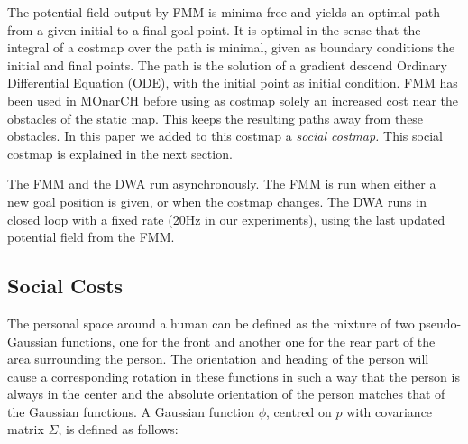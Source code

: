 The potential field output by FMM is minima free and yields an optimal path from a given initial to a final goal point. It is optimal in the sense that the integral of a costmap over the path is minimal, given as boundary conditions the initial and final points. The path is the solution of a gradient descend Ordinary Differential Equation (ODE), with the initial point as initial condition. FMM has been used in MOnarCH before using as costmap solely an increased cost near the obstacles of the static map. This keeps the resulting paths away from these obstacles. In this paper we added to this costmap a \emph{social costmap.} This social costmap is explained in the next section.

The FMM and the DWA run asynchronously. The FMM is run when either a new goal position is given, or when the costmap changes. The DWA runs in closed loop with a fixed rate (20Hz in our experiments), using the last updated potential field from the FMM.



\subsection{Social Costs}


The personal space around a human can be defined as the mixture of two pseudo-Gaussian functions, one for the front and another one for the rear part of the area surrounding the person. The orientation and heading of the person will cause a corresponding rotation in these functions in such a way that the person is always in the center and the absolute orientation of the person matches that of the Gaussian functions. 
A Gaussian function $\phi$, centred on $p$ with covariance matrix $\Sigma$, is defined as follows:

